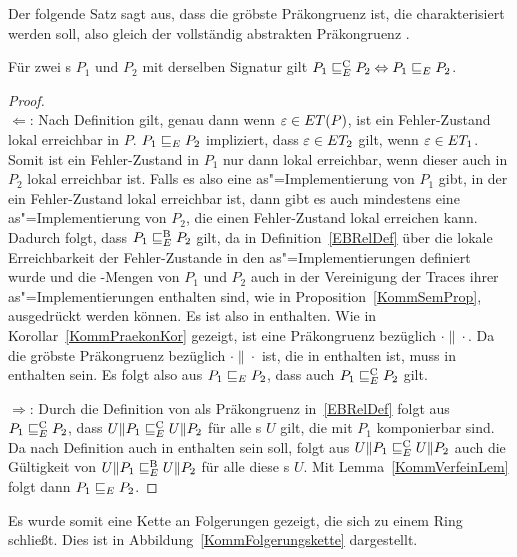 Der folgende Satz sagt aus, dass \ERel{} die gröbste Präkongruenz ist, die
charakterisiert werden soll, also gleich der vollständig abstrakten
Präkongruenz \ECRel{}.

\begin{Satz}
  \label{KommVollAbstraktSatz}
  Für zwei \MEIO{}s $P_1$ und $P_2$ mit derselben Signatur gilt $P_1 \sqsubseteq  _E^\mathrm{C}
  P_2\Leftrightarrow P_1 \sqsubseteq  _E{} P_2$.
\end{Satz}
\begin{proof}\mbox{}\\
  \glqq$\Leftarrow$\grqq: Nach Definition gilt, genau dann wenn
  $\varepsilon\in ET (P)$, ist ein Fehler-Zustand lokal erreichbar in $P$. $P_1
   \sqsubseteq  _E P_2$ impliziert, dass $\varepsilon\in ET _2$ gilt, wenn
  $\varepsilon\in ET _1$. Somit ist ein Fehler-Zustand in $P_1$ nur dann lokal
  erreichbar, wenn dieser auch in $P_2$ lokal erreichbar ist. Falls es also
  eine as"=Implementierung von $P_1$ gibt, in der ein Fehler-Zustand lokal
  erreichbar ist, dann gibt es auch mindestens eine as"=Implementierung von
  $P_2$, die einen Fehler-Zustand lokal erreichen kann. Dadurch folgt,
  dass $P_1 \sqsubseteq  _E^\mathrm{B} P_2$ gilt, da \EBRel{} in Definition~\ref{EBRelDef} über die
  lokale Erreichbarkeit der Fehler-Zustande in den as"=Implementierungen
  definiert wurde und die \ET{}-Mengen von $P_1$ und $P_2$ auch in der
  Vereinigung der Traces ihrer as"=Implementierungen enthalten sind, wie in
  Proposition~\ref{KommSemProp}, ausgedrückt werden können. Es ist also
  \ERel{} in \EBRel{} enthalten. Wie in Korollar~\ref{KommPraekonKor} gezeigt,
  ist \ERel{} eine Präkongruenz bezüglich $\cdot\|\cdot$. Da \ECRel{} die
  gröbste Präkongruenz bezüglich $\cdot\|\cdot$ ist, die in \EBRel{} enthalten
  ist, muss \ERel{} in \ECRel{} enthalten sein. Es folgt also aus $P_1 \sqsubseteq  _E{}
  P_2$, dass auch $P_1 \sqsubseteq  _E^\mathrm{C}{} P_2$ gilt.

  \glqq$\Rightarrow$\grqq: Durch die Definition von \ECRel{} als Präkongruenz
  in~\ref{EBRelDef} folgt aus $P_1 \sqsubseteq  _E^\mathrm{C}{} P_2$, dass $U\|P_1 \sqsubseteq  _E^\mathrm{C} U\|P_2$ für
  alle \MEIO{}s $U$ gilt, die mit $P_1$ komponierbar sind. Da \ECRel{} nach
  Definition auch in \EBRel{} enthalten sein soll, folgt aus $U\|P_1 \sqsubseteq  _E^\mathrm{C}{}
  U\|P_2$ auch die Gültigkeit von $U\|P_1 \sqsubseteq  _E^\mathrm{B}{}U\|P_2$ für alle diese
  \MEIO{}s $U$. Mit Lemma~\ref{KommVerfeinLem} folgt dann $P_1 \sqsubseteq  _E{} P_2$.
\end{proof}

Es wurde somit eine Kette an Folgerungen gezeigt, die sich zu einem Ring
schließt. Dies ist in Abbildung~\ref{KommFolgerungskette} dargestellt.

